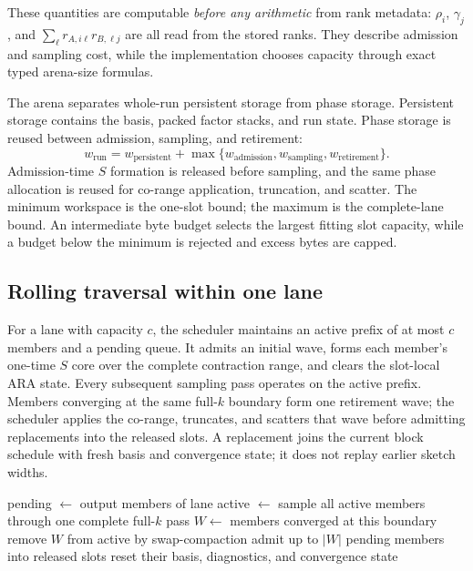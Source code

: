\documentclass[11pt]{article}
\begin{document}
These quantities are computable \emph{before any arithmetic} from rank metadata:
$\rho_i$, $\gamma_j$, and $\sum_\ell r_{A,i\ell}r_{B,\ell j}$ are all read from
the stored ranks. They describe admission and sampling cost, while the
implementation chooses capacity through exact typed arena-size formulas.

The arena separates whole-run persistent storage from phase storage. Persistent
storage contains the basis, packed factor stacks, and run state. Phase storage
is reused between admission, sampling, and retirement:
\begin{equation}
\label{eq:arena}
w_{\mathrm{run}}=w_{\mathrm{persistent}}+
\max\{w_{\mathrm{admission}},w_{\mathrm{sampling}},w_{\mathrm{retirement}}\}.
\end{equation}
Admission-time $S$ formation is released before sampling, and the same phase
allocation is reused for co-range application, truncation, and scatter. The
minimum workspace is the one-slot bound; the maximum is the complete-lane
bound. An intermediate byte budget selects the largest fitting slot capacity,
while a budget below the minimum is rejected and excess bytes are capped.

\subsection{Rolling traversal within one lane}
\label{sec:traversal}

For a lane with capacity $c$, the scheduler maintains an active prefix of at
most $c$ members and a pending queue. It admits an initial wave, forms each
member's one-time $S$ core over the complete contraction range, and clears the
slot-local ARA state. Every subsequent sampling pass operates on the active
prefix. Members converging at the same full-$k$ boundary form one retirement
wave; the scheduler applies the co-range, truncates, and scatters that wave
before admitting replacements into the released slots. A replacement joins
the current block schedule with fresh basis and convergence state; it does not
replay earlier sketch widths.

\begin{algorithm}[H]
\caption{\textsc{Schedule} --- rolling admission in one lane}
\label{alg:sched}
\begin{algorithmic}[1]
  \State pending $\gets$ output members of lane
  \State active $\gets$ 
     \State sample all active members through one complete full-$k$ pass
     \State $W\gets$ members converged at this boundary
        \State {}
        \State remove $W$ from active by swap-compaction
        \State admit up to $|W|$ pending members into released slots
        \State reset their basis, diagnostics, and convergence state
     \EndIf
  \EndWhile
\EndProcedure
\end{algorithmic}
\end{algorithm}
\end{document}
